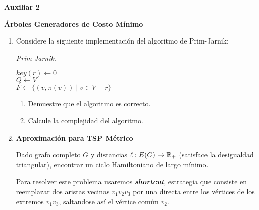 

\header
\begin{center}
	\LARGE \bf{Auxiliar 2}
\end{center}

\begin{center}
	\bf{Árboles Generadores de Costo Mínimo}\\
\end{center}

\small

\begin{enumerate}[label ={\bf P\arabic*}]
	\item Considere la siguiente implementación del algoritmo de Prim-Jarnik:
	
	\begin{algorithm}
		\footnotesize
		\label{alg:1}
		\caption{\textit{Prim-Jarnik}.}
		$key(r) \gets 0$\\
		$Q \gets V$\\
		$F\gets \{(v,\pi(v)) \mid v \in V-r\}$\\
	\end{algorithm}
	
	\begin{enumerate}
		\item Demuestre que el algoritmo es correcto.
		\item Calcule la complejidad del algoritmo.
	\end{enumerate}

	\item \textbf{Aproximación para TSP Métrico}
	
	Dado grafo completo $G$ y distancias $\ell: E(G) \rightarrow \mathbb{R}_{+}$ (satisface la desigualdad triangular), encontrar un ciclo Hamiltoniano de largo mínimo.

	Para resolver este problema usaremos \textbf{\textit{shortcut}}, estrategia que consiste en reemplazar dos aristas vecinas $v_1 v_2 v_3$ por una directa entre los vértices de los extremos $v_1 v_3$, saltandose así el vértice común $v_2$.


\end{enumerate}
